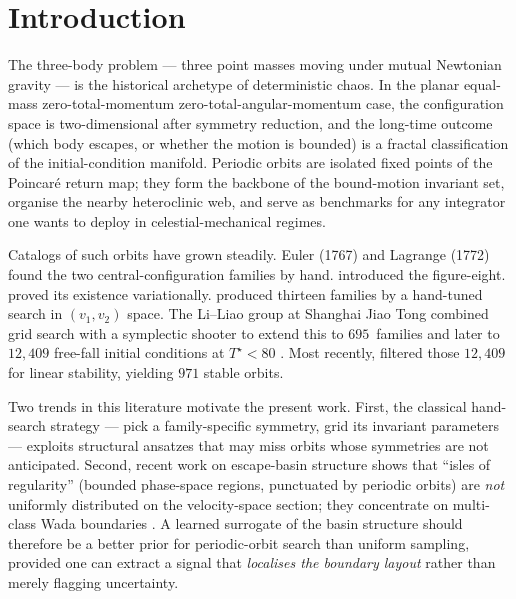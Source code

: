 \documentclass[11pt]{article}
\begin{document}
\tableofcontents
\newpage

\section{Introduction}

The three-body problem --- three point masses moving under mutual
Newtonian gravity --- is the historical archetype of deterministic
chaos. In the planar equal-mass zero-total-momentum
zero-total-angular-momentum case, the configuration space is
two-dimensional after symmetry reduction, and the long-time outcome
(which body escapes, or whether the motion is bounded) is a fractal
classification of the initial-condition manifold. Periodic orbits are
isolated fixed points of the Poincar\'{e} return map; they form the
backbone of the bound-motion invariant set, organise the nearby
heteroclinic web, and serve as benchmarks for any integrator one wants
to deploy in celestial-mechanical regimes.

Catalogs of such orbits have grown steadily. Euler (1767) and Lagrange
(1772) found the two central-configuration families by hand.
\citet{Moore1993} introduced the figure-eight. \citet{Chenciner2000}
proved its existence variationally. \citet{Suvakov2013} produced
thirteen families by a hand-tuned search in $(v_1, v_2)$ space. The
Li--Liao group at Shanghai Jiao Tong combined grid search with a
symplectic shooter to extend this to $695$~families \citep{LiLiao2017}
and later to $12{,}409$ free-fall initial conditions at $T^{\star}<80$
\citep{Hristov2024Catalog}. Most recently, \citet{Hristov2025Stable}
filtered those $12{,}409$ for linear stability, yielding $971$
stable orbits.

Two trends in this literature motivate the present work. First, the
classical hand-search strategy --- pick a family-specific symmetry,
grid its invariant parameters --- exploits structural ansatzes that may
miss orbits whose symmetries are not anticipated. Second, recent work
on escape-basin structure \citep{Trani2024, Manwadkar2021} shows that
``isles of regularity'' (bounded phase-space regions, punctuated by
periodic orbits) are \emph{not} uniformly distributed on the
velocity-space section; they concentrate on multi-class Wada boundaries
\citep{GOY1983, MGOY1985, Aguirre2001, Poon1996}. A learned surrogate
of the basin structure should therefore be a better prior for
periodic-orbit search than uniform sampling, provided one can extract a
signal that \emph{localises the boundary layout} rather than merely
flagging uncertainty.
\end{document}
